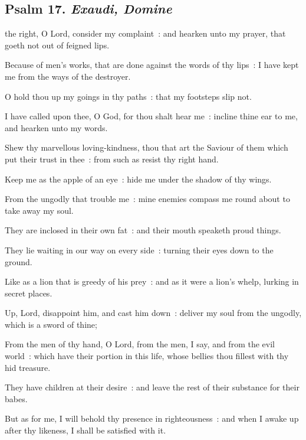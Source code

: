 \subsection{Psalm 17. \textit{Exaudi, Domine}}


 the right, O Lord, consider my complaint~: and hearken unto my prayer, that goeth not out of feigned lips.\par
{}
Because of men's works, that are done against the words of thy lips~: I have kept me from the ways of the destroyer.\par
{}O hold thou up my goings in thy paths~: that my footsteps slip not.\par
{}I have called upon thee, O God, for thou shalt hear me~: incline thine ear to me, and hearken unto my words.\par
{}Shew thy marvellous loving-kindness, thou that art the Saviour of them which put their trust in thee~: from such as resist thy right hand.\par
{}Keep me as the apple of an eye~: hide me under the shadow of thy wings.\par
{}From the ungodly that trouble me~: mine enemies compass me round about to take away my soul.\par
{}They are inclosed in their own fat~: and their mouth speaketh proud things.\par
{}They lie waiting in our way on every side~: turning their eyes down to the ground.\par
{}Like as a lion that is greedy of his prey~: and as it were a lion's whelp, lurking in secret places.\par
{}Up, Lord, disappoint him, and cast him down~: deliver my soul from the ungodly, which is a sword of thine;\par
{}From the men of thy hand, O Lord, from the men, I say, and from the evil world~: which have their portion in this life, whose bellies thou fillest with thy hid treasure.\par
{}They have children at their desire~: and leave the rest of their substance for their babes.\par
{}But as for me, I will behold thy presence in righteousness~: and when I awake up after thy likeness, I shall be satisfied with it.\par

